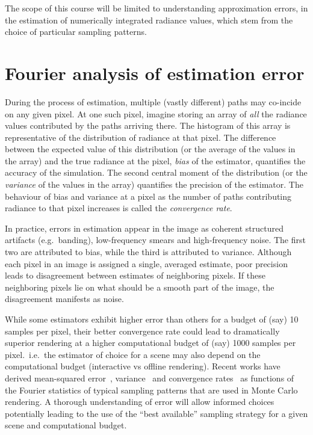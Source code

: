 \documentclass{acmsiggraph}
\begin{document}
The scope of this course will be limited to understanding approximation errors, in the estimation of numerically integrated radiance values, which stem from the choice of particular sampling patterns.

\section{Fourier analysis of estimation error}
During the process of estimation, multiple (vastly different) paths may co-incide on any given pixel. At one such pixel, imagine storing an array of \textit{all} the radiance values contributed by the paths arriving there. The histogram of this array is representative of the distribution of radiance at that pixel. The difference between the expected value of this distribution (or the average of the values in the array) and the true radiance at the pixel, \textit{bias} of the estimator, quantifies the accuracy of the simulation.  The second central moment of the distribution (or the \textit{variance} of the values in the array) quantifies the precision of the estimator. The behaviour of bias and variance at a pixel as the number of paths contributing radiance to that pixel increases is called the \textit{convergence rate}. 

In practice, errors in estimation appear in the image as coherent structured artifacts (e.g.~banding), low-frequency smears and high-frequency noise. The first two are attributed to bias, while the third is attributed to variance. Although each pixel in an image is assigned a single, averaged estimate, poor precision leads to disagreement between estimates of neighboring pixels. If these neighboring pixels lie on what should be a smooth part of the image, the disagreement manifests as noise.

While some estimators exhibit higher error than others for a budget of (say) 10 samples per pixel, their better convergence rate could lead to dramatically superior rendering at a higher computational budget of (say) 1000 samples per pixel.~i.e.~the estimator of choice for a scene may also depend on the computational budget (interactive vs offline rendering). Recent works have derived mean-squared error~\cite{durand2011frequency,Ramamoorthi:2012}, variance~\cite{Subr:2013:FAS,subr14error} and convergence rates~\cite{Pilleboue:2015:VAM} as functions of the Fourier statistics of typical sampling patterns that are used in Monte Carlo rendering. A thorough understanding of error will allow informed choices potentially leading to the use of the ``best available'' sampling strategy for a given scene and computational budget. 
\end{document}
